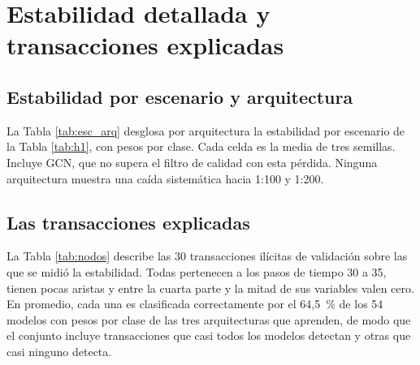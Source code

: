 \chapter{Estabilidad detallada y transacciones explicadas}\label{anx:detalle}

\section{Estabilidad por escenario y arquitectura}

La Tabla \ref{tab:esc_arq} desglosa por arquitectura la estabilidad por escenario de la Tabla
\ref{tab:h1}, con pesos por clase. Cada celda es la media de tres semillas. Incluye GCN, que no
supera el filtro de calidad con esta pérdida. Ninguna arquitectura muestra una caída sistemática
hacia 1:100 y 1:200.

\begin{table}[ht]
\centering
\caption{Estabilidad entre réplicas por escenario y arquitectura (pesos por clase, media de 3
semillas).}
\label{tab:esc_arq}
\scriptsize
\setlength{\tabcolsep}{3pt}

\end{table}

\section{Las transacciones explicadas}

La Tabla \ref{tab:nodos} describe las 30 transacciones ilícitas de validación sobre las que se
midió la estabilidad. Todas pertenecen a los pasos de tiempo 30 a 35, tienen pocas aristas y
entre la cuarta parte y la mitad de sus variables valen cero. En promedio, cada una es
clasificada correctamente por el 64,5~\% de los 54 modelos con pesos por clase de las tres
arquitecturas que aprenden, de modo que el conjunto incluye transacciones que casi todos los
modelos detectan y otras que casi ninguno detecta.

{\small

}
